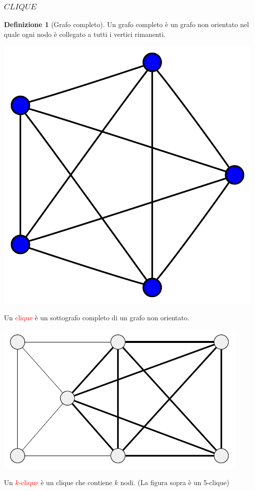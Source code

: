 \documentclass{article}  %
\theoremstyle{definition}
\newtheorem{definition}{Definizione}[section]
\begin{document}
\subsubsection{$CLIQUE$}
\begin{definition}[Grafo completo]
	Un grafo completo è un grafo non orientato nel quale ogni nodo è collegato a tutti i vertici rimanenti.
	\begin{center}
		\includegraphics[width=0.2\linewidth]{complete-graph.png}
	\end{center}
\end{definition}
Un \textcolor{red}{clique} è un sottografo completo di un grafo non orientato.
\begin{center}
	\includegraphics[width=0.3\linewidth]{clique.png}
\end{center}
Un \textcolor{red}{$k$-clique} è un clique che contiene $k$ nodi. (La figura sopra è un 5-clique)
\end{document}
